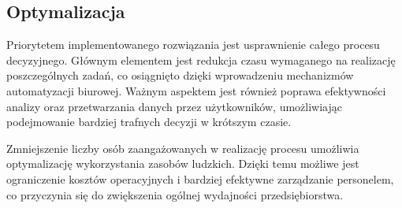 \subsection{Optymalizacja}
Priorytetem implementowanego rozwiązania jest usprawnienie całego procesu decyzyjnego. Głównym elementem jest redukcja czasu wymaganego na realizację poszczególnych zadań, co osiągnięto dzięki wprowadzeniu mechanizmów automatyzacji biurowej. Ważnym aspektem jest również poprawa efektywności analizy oraz przetwarzania danych przez użytkowników, umożliwiając podejmowanie bardziej trafnych decyzji w krótszym czasie.

Zmniejszenie liczby osób zaangażowanych w realizację procesu umożliwia optymalizację wykorzystania zasobów ludzkich. Dzięki temu możliwe jest ograniczenie kosztów operacyjnych i bardziej efektywne zarządzanie personelem, co przyczynia się do zwiększenia ogólnej wydajności przedsiębiorstwa.